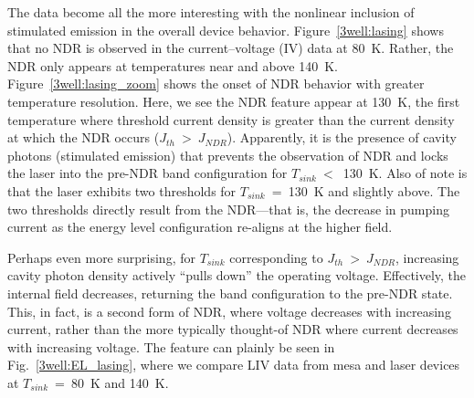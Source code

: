 \medskip

The data become all the more interesting with the nonlinear inclusion of stimulated emission in the overall device behavior. Figure~\ref{3well:lasing} shows that no NDR is observed in the current--voltage (IV) data at 80~K.  Rather, the NDR only appears at temperatures near and above 140~K.  Figure~\ref{3well:lasing_zoom} shows the onset of NDR behavior with greater temperature resolution.  Here, we see the NDR feature appear at 130~K, the first temperature where threshold current density is greater than the current density at which the NDR occurs ($J_{th}~>~J_{NDR}$).  Apparently, it is the presence of cavity photons (stimulated emission) that prevents the observation of NDR and locks the laser into the pre-NDR band configuration for $T_{sink}~<$~130~K.  Also of note is that the laser exhibits two thresholds for $T_{sink}$~=~130~K and slightly above.  The two thresholds directly result from the NDR---that is, the decrease in pumping current as the energy level configuration re-aligns at the higher field.

Perhaps even more surprising, for $T_{sink}$ corresponding to $J_{th}~>~J_{NDR}$, increasing cavity photon density actively ``pulls down'' the operating voltage.  Effectively, the internal field decreases, returning the band configuration to the pre-NDR state.  This, in fact, is a second form of NDR, where voltage decreases with increasing current, rather than the more typically thought-of NDR where current decreases with increasing voltage. The feature can plainly be seen in Fig.~\ref{3well:EL_lasing}, where we compare LIV data from mesa and laser devices at $T_{sink}$~=~80~K and 140~K.

